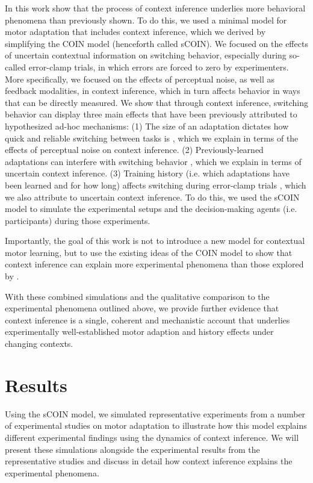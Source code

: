 \documentclass[a4paper,doc,floatsintext,natbib]{apa6}
\begin{document}
In this work show that the process of context inference underlies more behavioral phenomena than previously shown. To do this, we used a minimal model for motor adaptation that includes context inference, which we derived by simplifying the COIN model (henceforth called sCOIN). We focused on the effects of uncertain contextual information on switching behavior, especially during so-called error-clamp trials, in which errors are forced to zero by experimenters. More specifically, we focused on the effects of perceptual noise, as well as feedback modalities, in context inference, which in turn affects behavior in ways that can be directly measured. We show that through context inference, switching behavior can display three main effects that have been previously attributed to hypothesized ad-hoc mechanisms: (1) The size of an adaptation dictates how quick and reliable switching between tasks is \citep{Oh_Minimizing_2019,Kim_Neural_2015}, which we explain in terms of the effects of perceptual noise on context inference. (2) Previously-learned adaptations can interfere with switching behavior \citep{Davidson_Scaling_2004}, which we explain in terms of uncertain context inference. (3) Training history (i.e. which adaptations have been learned and for how long) affects switching during error-clamp trials \citep{Vaswani_Decay_2013}, which we also attribute to uncertain context inference. To do this, we used the sCOIN model to simulate the experimental setups and the decision-making agents (i.e. participants) during those experiments.

Importantly, the goal of this work is not to introduce a new model for contextual motor learning, but to use the existing ideas of the COIN model to show that context inference can explain more experimental phenomena than those explored by \cite{Heald_Contextual_2021}.

With these combined simulations and the qualitative comparison to the experimental phenomena outlined above, we provide further evidence that context inference is a single, coherent and mechanistic account that underlies experimentally well-established motor adaption and history effects under changing contexts.

\section{Results}
Using the sCOIN model, we simulated representative experiments from a number of experimental studies on motor adaptation to illustrate how this model explains different experimental findings using the dynamics of context inference. We will present these simulations alongside the experimental results from the representative studies and discuss in detail how context inference explains the experimental phenomena.
\end{document}
